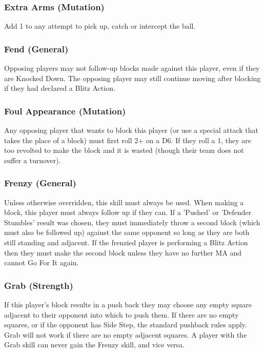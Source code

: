 \begin{multicols}{3}
\subsubsection{Extra Arms (Mutation)}
\par Add 1 to any attempt to pick up, catch or intercept the ball.

\subsubsection{Fend (General)}
\par Opposing players may not follow-up blocks made against this player, even if they are Knocked Down. The opposing player may still continue moving after blocking if they had declared a Blitz Action.

\subsubsection{Foul Appearance (Mutation)}
\par Any opposing player that wants to block this player (or use a special attack that takes the place of a block) must first roll 2+ on a D6. If they roll a 1, they are too revolted to make the block and it is wasted (though their team does not suffer a turnover).

\subsubsection{Frenzy (General)}
\par Unless otherwise overridden, this skill must always be used. When making a block, this player must always follow up if they can. If a 'Pushed' or 'Defender Stumbles' result was chosen, they must immediately throw a second block (which must also be followed up) against the same opponent so long as they are both still standing and adjacent. If the frenzied player is performing a Blitz Action then they must make the second block unless they have no further MA and cannot Go For It again.

\subsubsection{Grab (Strength)}
\par If this player's block results in a push back they may choose any empty square adjacent to their opponent into which to push them. If there are no empty squares, or if the opponent has Side Step, the standard pushback rules apply. Grab will not work if there are no empty adjacent squares. A player with the Grab skill can never gain the Frenzy skill, and vice versa.


\end{multicols}
